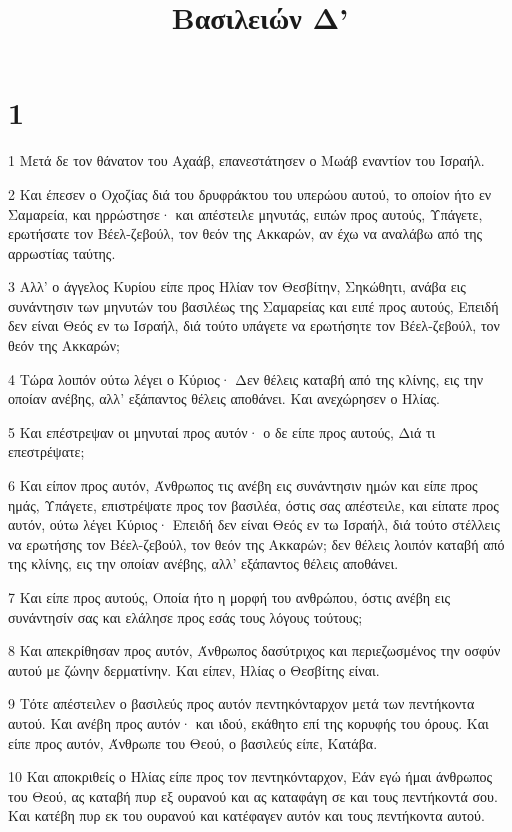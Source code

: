 

\title{Βασιλειών Δ'}


\chapter{1}

\par 1 Μετά δε τον θάνατον του Αχαάβ, επανεστάτησεν ο Μωάβ εναντίον του Ισραήλ.
\par 2 Και έπεσεν ο Οχοζίας διά του δρυφράκτου του υπερώου αυτού, το οποίον ήτο εν Σαμαρεία, και ηρρώστησε· και απέστειλε μηνυτάς, ειπών προς αυτούς, Υπάγετε, ερωτήσατε τον Βέελ-ζεβούλ, τον θεόν της Ακκαρών, αν έχω να αναλάβω από της αρρωστίας ταύτης.
\par 3 Αλλ' ο άγγελος Κυρίου είπε προς Ηλίαν τον Θεσβίτην, Σηκώθητι, ανάβα εις συνάντησιν των μηνυτών του βασιλέως της Σαμαρείας και ειπέ προς αυτούς, Επειδή δεν είναι Θεός εν τω Ισραήλ, διά τούτο υπάγετε να ερωτήσητε τον Βέελ-ζεβούλ, τον θεόν της Ακκαρών;
\par 4 Τώρα λοιπόν ούτω λέγει ο Κύριος· Δεν θέλεις καταβή από της κλίνης, εις την οποίαν ανέβης, αλλ' εξάπαντος θέλεις αποθάνει. Και ανεχώρησεν ο Ηλίας.
\par 5 Και επέστρεψαν οι μηνυταί προς αυτόν· ο δε είπε προς αυτούς, Διά τι επεστρέψατε;
\par 6 Και είπον προς αυτόν, Άνθρωπος τις ανέβη εις συνάντησιν ημών και είπε προς ημάς, Υπάγετε, επιστρέψατε προς τον βασιλέα, όστις σας απέστειλε, και είπατε προς αυτόν, ούτω λέγει Κύριος· Επειδή δεν είναι Θεός εν τω Ισραήλ, διά τούτο στέλλεις να ερωτήσης τον Βέελ-ζεβούλ, τον θεόν της Ακκαρών; δεν θέλεις λοιπόν καταβή από της κλίνης, εις την οποίαν ανέβης, αλλ' εξάπαντος θέλεις αποθάνει.
\par 7 Και είπε προς αυτούς, Οποία ήτο η μορφή του ανθρώπου, όστις ανέβη εις συνάντησίν σας και ελάλησε προς εσάς τους λόγους τούτους;
\par 8 Και απεκρίθησαν προς αυτόν, Άνθρωπος δασύτριχος και περιεζωσμένος την οσφύν αυτού με ζώνην δερματίνην. Και είπεν, Ηλίας ο Θεσβίτης είναι.
\par 9 Τότε απέστειλεν ο βασιλεύς προς αυτόν πεντηκόνταρχον μετά των πεντήκοντα αυτού. Και ανέβη προς αυτόν· και ιδού, εκάθητο επί της κορυφής του όρους. Και είπε προς αυτόν, Άνθρωπε του Θεού, ο βασιλεύς είπε, Κατάβα.
\par 10 Και αποκριθείς ο Ηλίας είπε προς τον πεντηκόνταρχον, Εάν εγώ ήμαι άνθρωπος του Θεού, ας καταβή πυρ εξ ουρανού και ας καταφάγη σε και τους πεντήκοντά σου. Και κατέβη πυρ εκ του ουρανού και κατέφαγεν αυτόν και τους πεντήκοντα αυτού.
